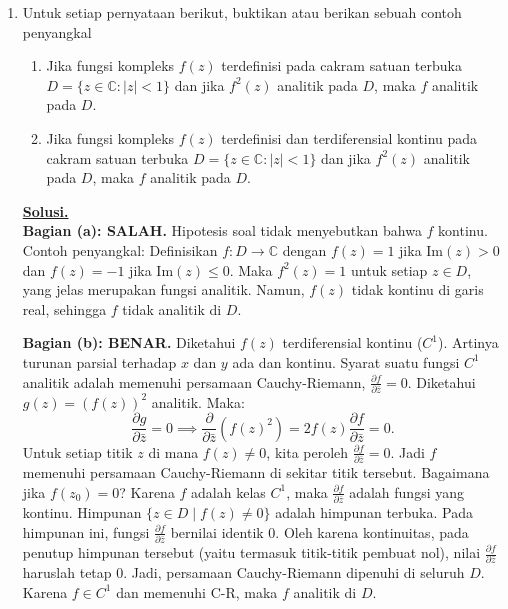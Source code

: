\documentclass[12pt,twoside]{article}
\newenvironment{solution}
{
	\par\noindent\textbf{\underline{Solusi.}}\\
}
{
	\par
}
\begin{document}
\begin{enumerate}
  \item Untuk setiap pernyataan berikut, buktikan atau berikan sebuah contoh penyangkal
        \begin{enumerate}
          \item [(a)] Jika fungsi kompleks $f(z)$ terdefinisi pada cakram satuan terbuka $D=\{z\in\mathbb{C}:|z|<1\}$ dan jika $f^2(z)$ analitik pada $D$, maka $f$ analitik pada $D$.
          \item[(b)] Jika fungsi kompleks $f(z)$ terdefinisi dan terdiferensial kontinu pada cakram satuan terbuka $D=\{z\in\mathbb{C}:|z|<1\}$ dan jika $f^2(z)$ analitik pada $D$, maka $f$ analitik pada $D$.
        \end{enumerate}
        \begin{solution}
          \textbf{Bagian (a): SALAH.}
          Hipotesis soal tidak menyebutkan bahwa $f$ kontinu.
          Contoh penyangkal:
          Definisikan $f: D \to \mathbb{C}$ dengan $f(z) = 1$ jika Im$(z) > 0$ dan $f(z) = -1$ jika Im$(z) \le 0$.
          Maka $f^2(z) = 1$ untuk setiap $z \in D$, yang jelas merupakan fungsi analitik.
          Namun, $f(z)$ tidak kontinu di garis real, sehingga $f$ tidak analitik di $D$.

          \textbf{Bagian (b): BENAR.}
          Diketahui $f(z)$ terdiferensial kontinu ($C^1$). Artinya turunan parsial terhadap $x$ dan $y$ ada dan kontinu.
          Syarat suatu fungsi $C^1$ analitik adalah memenuhi persamaan Cauchy-Riemann, $\frac{\partial f}{\partial \bar{z}} = 0$.
          Diketahui $g(z) = (f(z))^2$ analitik. Maka:
          \[ \frac{\partial g}{\partial \bar{z}} = 0 \implies \frac{\partial}{\partial \bar{z}} (f(z)^2) = 2f(z) \frac{\partial f}{\partial \bar{z}} = 0. \]
          Untuk setiap titik $z$ di mana $f(z) \neq 0$, kita peroleh $\frac{\partial f}{\partial \bar{z}} = 0$. Jadi $f$ memenuhi persamaan Cauchy-Riemann di sekitar titik tersebut.
          Bagaimana jika $f(z_0) = 0$?
          Karena $f$ adalah kelas $C^1$, maka $\frac{\partial f}{\partial \bar{z}}$ adalah fungsi yang kontinu.
          Himpunan $\{z \in D \mid f(z) \neq 0\}$ adalah himpunan terbuka. Pada himpunan ini, fungsi $\frac{\partial f}{\partial \bar{z}}$ bernilai identik 0.
          Oleh karena kontinuitas, pada penutup himpunan tersebut (yaitu termasuk titik-titik pembuat nol), nilai $\frac{\partial f}{\partial \bar{z}}$ haruslah tetap 0.
          Jadi, persamaan Cauchy-Riemann dipenuhi di seluruh $D$. Karena $f \in C^1$ dan memenuhi C-R, maka $f$ analitik di $D$.
        \end{solution}


\end{enumerate}
\end{document}
